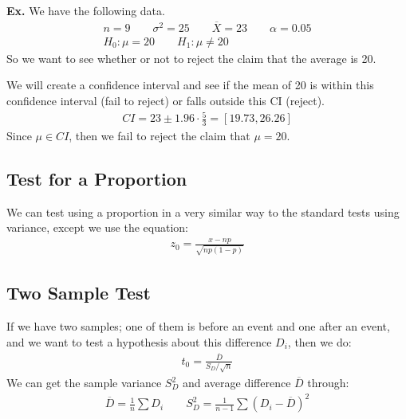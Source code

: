 \documentclass[12pt,letterpaper]{article} \usepackage{amsmath} \usepackage{graphicx} \usepackage[margin=1in]{geometry} \usepackage{longtable}  \usepackage{amssymb}
\begin{document}
	\begin{mdframed}
		\textbf{Ex.} We have the following data. 
		\begin{align*}
			n = 9 \qquad \sigma^2 = 25 \qquad \overline X = 23 \qquad \alpha = 0.05\\
			H_0: \mu = 20 \qquad H_1: \mu \ne 20
		\end{align*}
		So we want to see whether or not to reject the claim that the average is 20. 
		
		We will create a confidence interval and see if the mean of 20 is within this confidence interval (fail to reject) or falls outside this CI (reject). 
		\begin{align*}
			CI = 23\pm 1.96\cdot\frac{5}{3} = [19.73,26.26]
		\end{align*}
		Since $\mu\in CI$, then we fail to reject the claim that $\mu = 20$.
	\end{mdframed}
	
	
	\subsection{Test for a Proportion}
	We can test using a proportion in a very similar way to the standard tests using variance, except we use the equation:
	\begin{align*}
		z_0 = \frac{x-np}{\sqrt{np(1-p)}}
	\end{align*}
	
	\subsection{Two Sample Test}
	If we have two samples; one of them is before an event and one after an event, and we want to test a hypothesis about this difference $D_i$, then we do:
	\begin{align*}
		t_0 = \frac{\overline D}{S_D / \sqrt n}
	\end{align*}
	We can get the sample variance $S_D^2$ and average difference $\overline D$ through:
	\begin{align*}
		\overline D = \frac{1}{n} \sum D_i \qquad S_D^2 = \frac{1}{n-1}\sum (D_i - \overline D)^2
	\end{align*}
\end{document}
